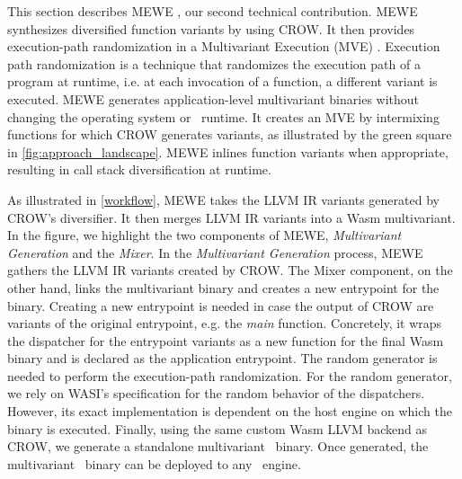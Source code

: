 
\label{section:mewe}

\renewcommand{\tool}{MEWE\xspace}
This section describes MEWE \cite{MEWE}, our second technical contribution. 
\tool synthesizes diversified function variants by using CROW.
It then provides execution-path randomization in a Multivariant Execution (MVE) \cite{bhatkar03}.
Execution path randomization is a technique that randomizes the execution path of a program at runtime, i.e. at each invocation of a function, a different variant is executed.
MEWE generates application-level multivariant binaries without changing the operating system or \wasm\ runtime.
It creates an MVE by intermixing functions for which CROW generates variants, as illustrated by the green square in \autoref{fig:approach_landscape}.
\tool inlines function variants when appropriate, resulting in call stack diversification at runtime.



As illustrated in \autoref{workflow}, MEWE takes the LLVM IR variants generated by CROW's diversifier. 
It then merges LLVM IR variants into a Wasm multivariant.
In the figure, we highlight the two components of MEWE, \emph{Multivariant Generation} and the \emph{Mixer}.
In the \emph{Multivariant Generation} process, 
MEWE gathers the LLVM IR variants created by CROW.
The Mixer component, on the other hand, links the multivariant binary and creates a new entrypoint for the binary.
Creating a new entrypoint is needed in case the output of CROW are variants of the original entrypoint, e.g. the \emph{main} function.
Concretely, it wraps the dispatcher for the entrypoint variants as a new function for the final Wasm binary and is declared as the application entrypoint.
The random generator is needed to perform the execution-path randomization.
For the random generator, we rely on WASI's specification \cite{WASI} for the random behavior of the dispatchers. 
However, its exact implementation is dependent on the host engine on which the binary is executed. 
Finally, using the same custom Wasm LLVM backend as CROW, we generate a standalone multivariant \wasm\ binary.
Once generated, the multivariant \wasm\ binary can be deployed to any \wasm\ engine. 

